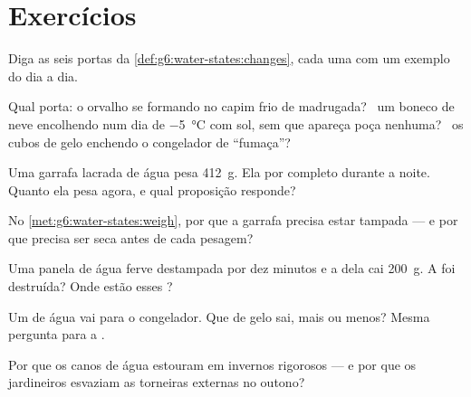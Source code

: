 \section{Exercícios}

\begin{exercise}[$\star$]\label{exo:g6:water-states:1}
Diga as seis portas da \cref{def:g6:water-states:changes}, cada uma
com um exemplo do dia a dia.
\end{exercise}

\begin{exercise}[$\star$]\label{exo:g6:water-states:2}
Qual porta: o orvalho se formando no capim frio de madrugada? \ um
boneco de neve encolhendo num dia de \qty{-5}{\celsius} com sol, sem
que apareça poça nenhuma? \ os cubos de gelo enchendo o congelador de
``fumaça''?
\end{exercise}

\begin{exercise}[$\star$]\label{exo:g6:water-states:3}
Uma garrafa lacrada de água pesa \qty{412}{g}. Ela  por
completo durante a noite. Quanto ela pesa agora, e qual proposição
responde?
\end{exercise}

\begin{exercise}[$\star$]\label{exo:g6:water-states:4}
No \cref{met:g6:water-states:weigh}, por que a garrafa precisa estar
tampada --- e por que precisa ser seca antes de cada pesagem?
\end{exercise}

\begin{exercise}[$\star$]\label{exo:g6:water-states:5}
Uma panela de água ferve destampada por dez minutos e a  dela
cai \qty{200}{g}. A  foi destruída? Onde estão esses ?
\end{exercise}

\begin{exercise}[$\star$]\label{exo:g6:water-states:6}
Um  de água vai para o congelador. Que  de gelo sai, mais
ou menos? Mesma pergunta para a .
\end{exercise}

\begin{exercise}[$\star$]\label{exo:g6:water-states:7}
Por que os canos de água estouram em invernos rigorosos --- e por que
os jardineiros esvaziam as torneiras externas no outono?
\end{exercise}

